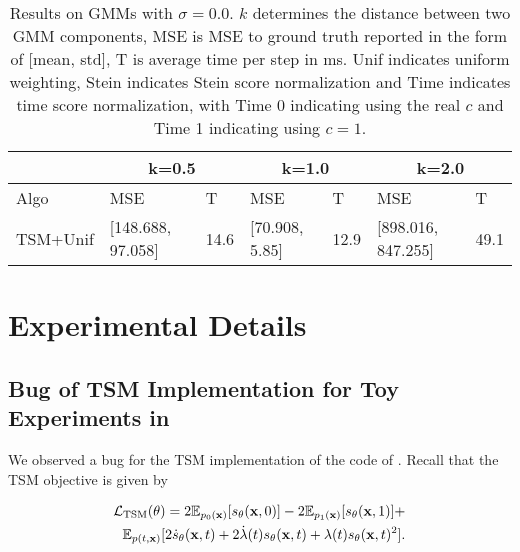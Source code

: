 \begin{table*}
        \begin{center}
        \caption{Results on GMMs with $\sigma=0.0$. $k$ determines the distance between two GMM components, MSE is MSE to ground truth reported in the form of [mean, std], T is average time per step in ms. Unif indicates uniform weighting, Stein indicates Stein score normalization and Time indicates time score normalization, with Time 0 indicating using the real $c$ and Time 1 indicating using $c=1$.}
                \begin{tabular}{|l|l|l|l|l|l|l|}
                        \hline
                        & \multicolumn{2}{|c|}{k=0.5} & \multicolumn{2}{|c|}{k=1.0} & \multicolumn{2}{|c|}{k=2.0} \\
                        \hline
                        Algo & MSE & T & MSE & T & MSE & T \\
                        \hline
                        TSM+Unif & [148.688, 97.058] & 14.6 & [70.908, 5.85] & 12.9 & [898.016, 847.255] & 49.1 \\
                        \hline
                \end{tabular}
        \label{tbl:gmms-0.0}
        \end{center}
\end{table*}

\newpage
\section{Experimental Details}
\label{app:sec:exp}

\subsection{Bug of TSM Implementation for Toy Experiments in \citet{choi2022densityratio}}
\label{app:sec:bug_tsm_toy}

We observed a bug for the TSM implementation of the code of \citet{choi2022densityratio}. Recall that the TSM objective is given by

\begin{align}
\begin{split}
    \mathcal{L}_{\text{TSM}}(\operatorname{\mathbf{\theta}})
    =
    2 \mathbb{E}_{p_0(\operatorname{\mathbf{x}})}[s_{\operatorname{\mathbf{\theta}}}(\operatorname{\mathbf{x}}, 0)]
    -
    2 \mathbb{E}_{p_1(\operatorname{\mathbf{x}})}[s_{\operatorname{\mathbf{\theta}}}(\operatorname{\mathbf{x}}, 1)]
    + 
    \\
    \mathbb{E}_{p(t, \operatorname{\mathbf{x}})}
    [
    2 \dot{s}_{\operatorname{\mathbf{\theta}}}(\operatorname{\mathbf{x}}, t) 
    +
    2 \dot{\lambda}(t)
    s_{\operatorname{\mathbf{\theta}}}(\operatorname{\mathbf{x}}, t)
    +
    \lambda(t)
    s_{\operatorname{\mathbf{\theta}}}(\operatorname{\mathbf{x}}, t)^{2}
    ].
\end{split}
\end{align}

